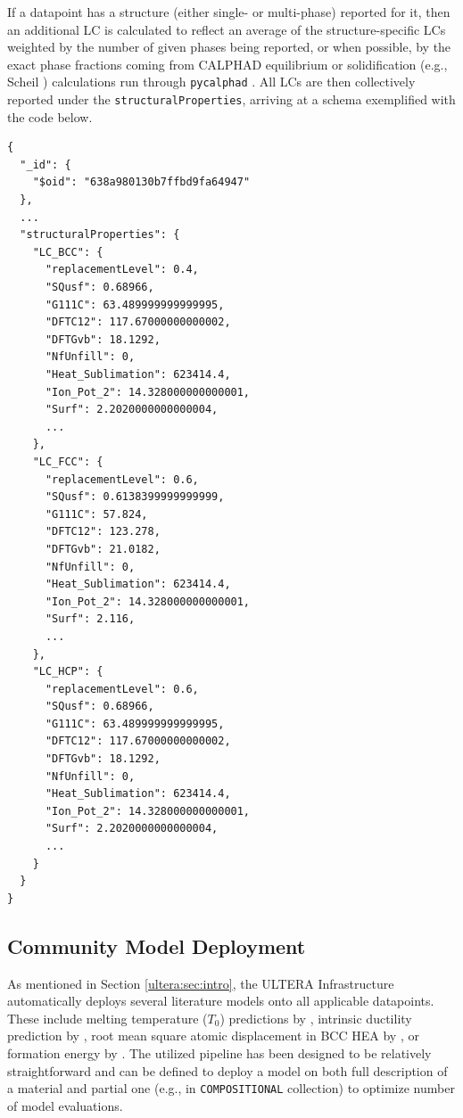 If a datapoint has a structure (either single- or multi-phase) reported for it, then an additional LC is calculated to reflect an average of the structure-specific LCs weighted by the number of given phases being reported, or when possible, by the exact phase fractions coming from CALPHAD equilibrium or solidification (e.g., Scheil \cite{Bocklund2020ExperimentalMaterials}) calculations run through \texttt{pycalphad} \cite{Otis2017Pycalphad:Python}. All LCs are then collectively reported under the \texttt{structuralProperties}, arriving at a schema exemplified with the code below.

\begin{verbatim}
{
  "_id": {
    "$oid": "638a980130b7ffbd9fa64947"
  },
  ...
  "structuralProperties": {
    "LC_BCC": {
      "replacementLevel": 0.4,
      "SQusf": 0.68966,
      "G111C": 63.489999999999995,
      "DFTC12": 117.67000000000002,
      "DFTGvb": 18.1292,
      "NfUnfill": 0,
      "Heat_Sublimation": 623414.4,
      "Ion_Pot_2": 14.328000000000001,
      "Surf": 2.2020000000000004,
      ...
    },
    "LC_FCC": {
      "replacementLevel": 0.6,
      "SQusf": 0.6138399999999999,
      "G111C": 57.824,
      "DFTC12": 123.278,
      "DFTGvb": 21.0182,
      "NfUnfill": 0,
      "Heat_Sublimation": 623414.4,
      "Ion_Pot_2": 14.328000000000001,
      "Surf": 2.116,
      ...
    },
    "LC_HCP": {
      "replacementLevel": 0.6,
      "SQusf": 0.68966,
      "G111C": 63.489999999999995,
      "DFTC12": 117.67000000000002,
      "DFTGvb": 18.1292,
      "NfUnfill": 0,
      "Heat_Sublimation": 623414.4,
      "Ion_Pot_2": 14.328000000000001,
      "Surf": 2.2020000000000004,
      ...
    }
  }
}
\end{verbatim}



\subsection{Community Model Deployment} \label{ultera:ssec:communitymodels}

As mentioned in Section \ref{ultera:sec:intro}, the ULTERA Infrastructure automatically deploys several literature models onto all applicable datapoints. These include melting temperature ($T_0$) predictions by \citet{Hong2022MeltingMaterials}, intrinsic ductility prediction by \citet{Hu2021ScreeningAlloys}, root mean square atomic displacement in BCC HEA by \citet{Tandoc2023MiningAlloys}, or formation energy by \citet{Krajewski2022ExtensibleNetworks}. The utilized pipeline has been designed to be relatively straightforward and can be defined to deploy a model on both full description of a material and partial one (e.g., in \texttt{COMPOSITIONAL} collection) to optimize number of model evaluations.

